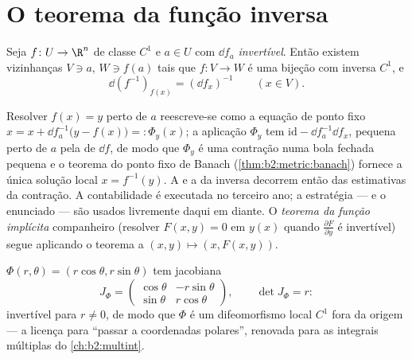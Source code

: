 \section{O teorema da função inversa}

\begin{theorem}\label{thm:b2:diffcalc:inverse}
Seja $f \colon U \to \R^n$ de classe $C^1$ e $a \in U$ com $\dd f_a$
\emph{invertível}. Então existem vizinhanças  $V \ni a$, $W
\ni f(a)$ tais que $f \colon V \to W$ é uma bijeção com inversa
$C^1$, e
\[
\dd (f^{-1})_{f(x)} = (\dd f_x)^{-1} \qquad (x \in V).
\]
\end{theorem}
\admitted

\begin{remark}
Resolver $f(x) = y$ perto de $a$ reescreve-se como a equação de ponto fixo
$x = x + \dd f_a^{-1}\bigl(y - f(x)\bigr) =: \Phi_y(x)$; a aplicação
$\Phi_y$ tem  $\mathrm{id} - \dd f_a^{-1}\dd f_x$,
pequena perto de $a$ pela  de $\dd f$, de modo que $\Phi_y$ é uma
contração numa bola fechada pequena e o teorema do ponto fixo de Banach
(\cref{thm:b2:metric:banach}) fornece a única solução local
$x = f^{-1}(y)$. A  e a  da
inversa decorrem então das estimativas da contração. A contabilidade 
é executada no terceiro ano; a estratégia --- e o
enunciado --- são usados livremente daqui em diante. O
\emph{teorema da função implícita} companheiro (resolver $F(x, y) = 0$ em $y(x)$
quando $\frac{\partial F}{\partial y}$ é invertível) segue
aplicando o teorema a $(x, y) \mapsto (x, F(x,y))$.
\end{remark}

\begin{example}\label{ex:b2:diffcalc:polar}
$\Phi(r, \theta) = (r\cos\theta, r\sin\theta)$ tem jacobiana
\[
J_\Phi = \begin{pmatrix} \cos\theta & -r\sin\theta\\ \sin\theta &
r\cos\theta \end{pmatrix},
\qquad \det J_\Phi = r :
\]
invertível para $r \neq 0$, de modo que $\Phi$ é um difeomorfismo local
$C^1$ fora da origem --- a licença para ``passar a coordenadas
polares'', renovada para as integrais múltiplas do
\cref{ch:b2:multint}.
\end{example}

